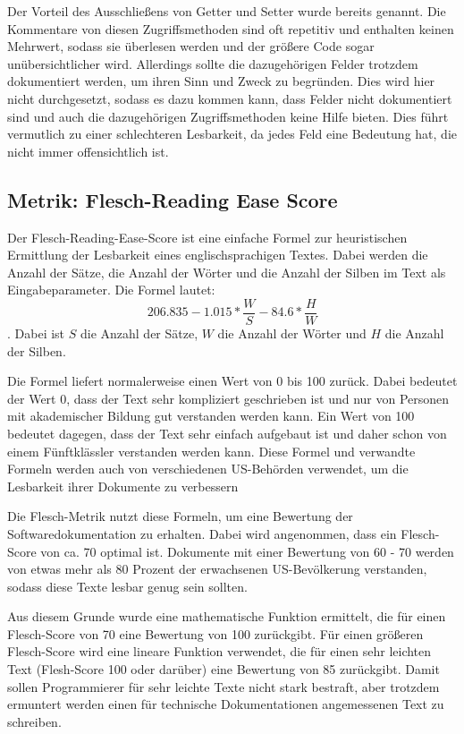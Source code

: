 Der Vorteil des Ausschließens von Getter und Setter wurde bereits genannt. Die Kommentare von diesen Zugriffsmethoden sind oft repetitiv und enthalten keinen Mehrwert, sodass sie überlesen werden und der größere Code sogar unübersichtlicher wird. Allerdings sollte die dazugehörigen Felder trotzdem dokumentiert werden, um ihren Sinn und Zweck zu begründen. Dies wird hier nicht durchgesetzt, sodass es dazu kommen kann, dass Felder nicht dokumentiert sind und auch die dazugehörigen Zugriffsmethoden keine Hilfe bieten. Dies führt vermutlich zu einer schlechteren Lesbarkeit, da jedes Feld eine Bedeutung hat, die nicht immer offensichtlich ist.
\subsection{Metrik: Flesch-Reading Ease Score}\label{chapter:metrics_flesh}
Der Flesch-Reading-Ease-Score\cite[S. 21]{ThePrinciplesofReadability} ist eine einfache Formel zur heuristischen Ermittlung der Lesbarkeit eines englischsprachigen Textes. Dabei werden die Anzahl der Sätze, die Anzahl der Wörter und die Anzahl der Silben im Text als Eingabeparameter. Die Formel lautet:
\begin{equation}
   206.835-1.015*\frac{W}{S}-84.6*\frac{H}{W}
\end{equation}. Dabei ist $S$ die Anzahl der Sätze, $W$ die Anzahl der Wörter und $H$ die Anzahl der Silben. 

Die Formel liefert normalerweise einen Wert von 0 bis 100 zurück. Dabei bedeutet der Wert 0, dass der Text sehr kompliziert geschrieben ist und nur von Personen mit akademischer Bildung gut verstanden werden kann. Ein Wert von 100 bedeutet dagegen, dass der Text sehr einfach aufgebaut ist und daher schon von einem Fünftklässler verstanden werden kann. Diese Formel und verwandte Formeln werden auch von verschiedenen US-Behörden verwendet, um die Lesbarkeit ihrer Dokumente zu verbessern \cite[S. 72]{AutomaticQualityAssessmentofSourceCodeComments:TheJavadocMiner}

Die Flesch-Metrik nutzt diese Formeln, um eine Bewertung der Softwaredokumentation zu erhalten. Dabei wird angenommen, dass ein Flesch-Score von ca. 70 optimal ist. Dokumente mit einer Bewertung von 60 - 70 werden von etwas mehr als 80 Prozent der erwachsenen US-Bevölkerung verstanden, sodass diese Texte lesbar genug sein sollten.

Aus diesem Grunde wurde eine mathematische Funktion ermittelt, die für einen Flesch-Score von 70 eine Bewertung von 100 zurückgibt. Für einen größeren Flesch-Score wird eine lineare Funktion verwendet, die für einen sehr leichten Text (Flesh-Score 100 oder darüber) eine Bewertung von 85 zurückgibt. Damit sollen Programmierer für sehr leichte Texte nicht stark bestraft, aber trotzdem ermuntert werden einen für technische Dokumentationen angemessenen Text zu schreiben.

